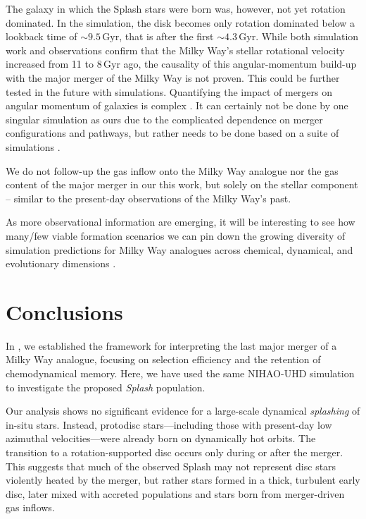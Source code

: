 \documentclass[fleqn,usenatbib]{mnras}
\begin{document}
The galaxy in which the Splash stars were born was, however, not yet rotation dominated. In the simulation, the disk becomes only rotation dominated below a lookback time of $\sim 9.5\,\mathrm{Gyr}$, that is after the first $\sim 4.3\,\mathrm{Gyr}$. While both simulation work and observations \citep[for example][]{MCM2013} confirm that the Milky Way's stellar rotational velocity increased from 11 to $8\,\mathrm{Gyr}$ ago, the causality of this angular-momentum build-up with the major merger of the Milky Way is not proven. This could be further tested in the future with simulations. Quantifying the impact of mergers on angular momentum of galaxies is complex \citep[see for example][]{Lagos2017, Lagos2018}. It can certainly not be done by one singular simulation as ours due to the complicated dependence on merger configurations and pathways, but rather needs to be done based on a suite of simulations \citep[see for example][]{Pillepich2019, SotilloRamos2022}.

We do not follow-up the gas inflow onto the Milky Way analogue nor the gas content of the major merger \citep[see for example][]{Agertz2021, Renaud2021b, Buck2023} in our this work, but solely on the stellar component -- similar to the present-day observations of the Milky Way's past.

As more observational information are emerging, it will be interesting to see how many/few viable formation scenarios we can pin down the growing diversity of simulation predictions for Milky Way analogues across chemical, dynamical, and evolutionary dimensions \citep{Brooks2025}. 

\section{Conclusions}
\label{sec:conclusions}

In , we established the framework for interpreting the last major merger of a Milky Way analogue, focusing on selection efficiency and the retention of chemodynamical memory. Here, we have used the same NIHAO-UHD simulation to investigate the proposed \textit{Splash} population.

Our analysis shows no significant evidence for a large-scale dynamical \textit{splashing} of in-situ stars. Instead, protodisc stars—including those with present-day low azimuthal velocities—were already born on dynamically hot orbits. The transition to a rotation-supported disc occurs only during or after the merger. This suggests that much of the observed Splash may not represent disc stars violently heated by the merger, but rather stars formed in a thick, turbulent early disc, later mixed with accreted populations and stars born from merger-driven gas inflows.
\end{document}
